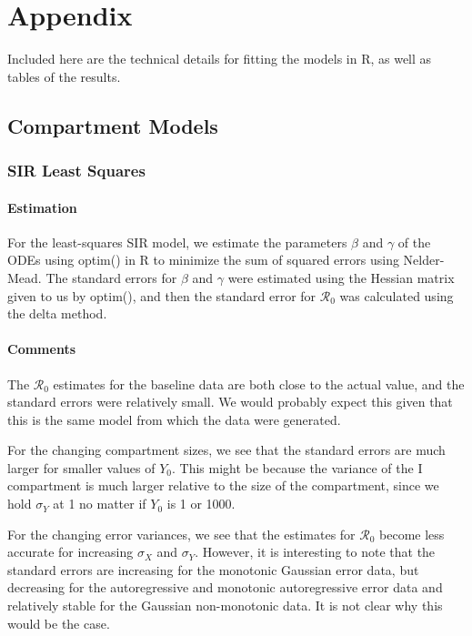 \documentclass[12pt]{article}
\newcommand{\rr}{\ensuremath{\mathcal{R}_0}}
\begin{document}



\section{Appendix}

Included here are the technical details for fitting the models in R, as well as tables of the results.

\subsection{Compartment Models}

\subsubsection{SIR Least Squares}

\paragraph{Estimation}

For the least-squares SIR model, we estimate the parameters $\beta$ and $\gamma$ of the ODEs using optim() in R to minimize the sum of squared errors using Nelder-Mead. The standard errors for $\beta$ and $\gamma$ were estimated using the Hessian matrix given to us by optim(), and then the standard error for $\rr$ was calculated using the delta method.

\paragraph{Comments}

The $\rr$ estimates for the baseline data are both close to the actual value, and the standard errors were relatively small. We would probably expect this given that this is the same model from which the data were generated. 

For the changing compartment sizes, we see that the standard errors are much larger for smaller values of $Y_0$. This might be because the variance of the I compartment is much larger relative to the size of the compartment, since we hold $\sigma_Y$ at 1 no matter if $Y_0$ is 1 or 1000. 

For the changing error variances, we see that the estimates for $\rr$ become less accurate for increasing $\sigma_X$ and $\sigma_Y$. However, it is interesting to note that the standard errors are increasing for the monotonic Gaussian error data, but decreasing for the autoregressive and monotonic autoregressive error data and relatively stable for the Gaussian non-monotonic data. It is not clear why this would be the case.
\end{document}
